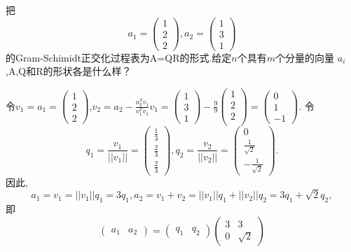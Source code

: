 ﻿\documentclass{book} \usepackage{exsheets} \usepackage{xeCJK}
\begin{document}
\begin{question}
  把
$$
a_1=
\begin{pmatrix}
  1\\
2\\
2
\end{pmatrix},a_2=
\begin{pmatrix}
  1\\
3\\
1
\end{pmatrix}
$$
的Gram-Schimidt正交化过程表为A=QR的形式.给定$n$个具有$m$个分量的向量
$a_i$,A,Q和R的形状各是什么样？
\end{question}
\begin{solution}
  令$v_1=a_1=
  \begin{pmatrix}
    1\\
2\\
2
  \end{pmatrix}
$,$v_2=a_2-\frac{a_2^Tv_1}{v_1^Tv_1}v_1=
\begin{pmatrix}
  1\\
3\\
1
\end{pmatrix}-\frac{9}{9}
\begin{pmatrix}
  1\\
2\\
2\\
\end{pmatrix}=
\begin{pmatrix}
  0\\
1\\
-1
\end{pmatrix}.
$
令
$$ 
q_1=\frac{v_1}{||v_1||}=
\begin{pmatrix}
  \frac{1}{3}\\
\frac{2}{3}\\
\frac{2}{3}
\end{pmatrix},q_2=\frac{v_2}{||v_2||}=
\begin{pmatrix}
0\\
\frac{1}{\sqrt{2}}\\
-\frac{1}{\sqrt{2}}
\end{pmatrix}.
 $$
因此,
$$
a_1=v_1=||v_1||q_1=3q_1,a_2=v_1+v_2=||v_1||q_1+||v_2||q_2=3q_1+\sqrt{2}q_2,
$$
即
$$
\begin{pmatrix}
  a_1&a_2
\end{pmatrix}=
\begin{pmatrix}
  q_1&q_2
\end{pmatrix}
\begin{pmatrix}
  3&3\\
0&\sqrt{2}

\end{pmatrix}$$
\end{solution}
\end{document}

